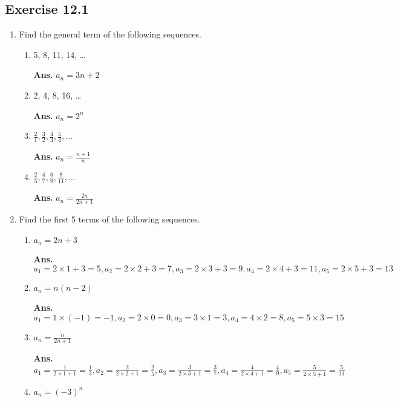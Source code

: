 \documentclass[a4paper]{report}
\begin{document}
	\subsection{Exercise 12.1}


	\begin{enumerate}

	\item Find the general term of the following sequences.

	\begin{enumerate}
		\item 5, 8, 11, 14, \ldots

			\textbf{Ans.} $a_{n} = 3n+2$

		\item 2, 4, 8, 16, \ldots

			\textbf{Ans.} $a_{n} = 2^{n}$

		\item $\frac{2}{1}, \frac{3}{2}, \frac{4}{3}, \frac{5}{4}, \ldots$

			\textbf{Ans.} $a_{n} = \frac{n+1}{n}$

		\item $\frac{2}{5}, \frac{4}{7}, \frac{6}{9}, \frac{8}{11}, \ldots$

			\textbf{Ans.} $a_{n} = \frac{2n}{2n+1}$
	\end{enumerate}

	\item Find the first 5 terms of the following sequences.

	\begin{enumerate}
		\item $a_{n} = 2n+3$

			\textbf{Ans.}
			$a_{1} = 2\times1+3 = 5, a_{2} = 2\times2+3 = 7, a_{3} = 2\times3+3 = 9, a_{4}
			= 2\times4+3 = 11, a_{5} = 2\times5+3 = 13$

		\item $a_{n} = n(n-2)$

			\textbf{Ans.}
			$a_{1} = 1\times(-1) = -1, a_{2} = 2\times0 = 0, a_{3} = 3\times1 = 3, a_{4}
			= 4\times2 = 8, a_{5} = 5\times3 = 15$

		\item $a_{n} = \frac{n}{2n+1}$

			\textbf{Ans.}
			$a_{1} = \frac{1}{2\times1+1}= \frac{1}{3}, a_{2} = \frac{2}{2\times2+1}= \frac{2}{5}
			, a_{3} = \frac{3}{2\times3+1}= \frac{3}{7}, a_{4} = \frac{4}{2\times4+1}=
			\frac{4}{9}, a_{5} = \frac{5}{2\times5+1}= \frac{5}{11}$

		\item $a_{n} = (-3)^{n}$


\end{enumerate}
\end{enumerate}
\end{document}
